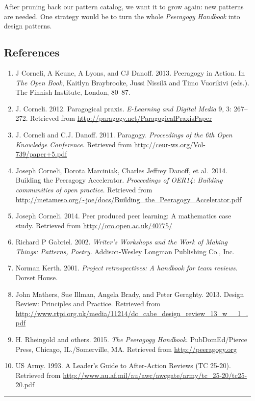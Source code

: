 After pruning back our pattern catalog, we want it to grow again: new
patterns are needed. One strategy would be to turn the whole
\emph{Peeragogy Handbook} into design patterns.

\hypertarget{references}{%
\subsection{References}\label{references}}

\begin{enumerate}
\def\labelenumi{\arabic{enumi}.}
\item
  J Corneli, A Keune, A Lyons, and CJ Danoff. 2013. Peeragogy in Action.
  In \emph{The Open Book}, Kaitlyn Braybrooke, Jussi Nissilä and Timo
  Vuorikivi (eds.). The Finnish Institute, London, 80--87.
\item
  J. Corneli. 2012. Paragogical praxis. \emph{E-Learning and Digital
  Media} 9, 3: 267--272. Retrieved from
  \url{http://paragogy.net/ParagogicalPraxisPaper}
\item
  J. Corneli and C.J. Danoff. 2011. Paragogy. \emph{Proceedings of the
  6th Open Knowledge Conference}. Retrieved from
  \url{http://ceur-ws.org/Vol-739/paper+5.pdf}
\item
  Joseph Corneli, Dorota Marciniak, Charles Jeffrey Danoff, et al.~2014.
  Building the Peeragogy Accelerator. \emph{Proceedings of OER14:
  Building communities of open practice}. Retrieved from
  \url{http://metameso.org/~joe/docs/Building_the_Peeragogy_Accelerator.pdf}
\item
  Joseph Corneli. 2014. Peer produced peer learning: A mathematics case
  study. Retrieved from \url{http://oro.open.ac.uk/40775/}
\item
  Richard P Gabriel. 2002. \emph{Writer's Workshops and the Work of
  Making Things: Patterns, Poetry.} Addison-Wesley Longman Publishing
  Co., Inc.
\item
  Norman Kerth. 2001. \emph{Project retrospectives: A handbook for team
  reviews}. Dorset House.
\item
  John Mathers, Sue Illman, Angela Brady, and Peter Geraghty. 2013.
  Design Review: Principles and Practice. Retrieved from
  \url{http://www.rtpi.org.uk/media/11214/dc_cabe_design_review_13_w__1_.pdf}
\item
  H. Rheingold and others. 2015. \emph{The Peeragogy Handbook}.
  PubDomEd/Pierce Press, Chicago, IL./Somerville, MA. Retrieved from
  \url{http://peeragogy.org}
\item
  US Army. 1993. A Leader's Guide to After-Action Reviews (TC 25-20).
  Retrieved from
  \url{http://www.au.af.mil/au/awc/awcgate/army/tc_25-20/tc25-20.pdf}
\end{enumerate}

\begin{center}\rule{0.5\linewidth}{0.5pt}\end{center}
